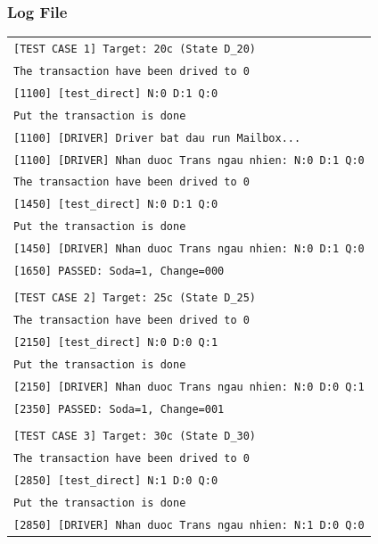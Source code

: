 \subsubsection*{Log File}

\begin{table}[H]
	\centering
	\begin{tabular}{|p{}|}
		\hline
		\texttt{\small [TEST CASE 1] Target: 20c (State D\_20)} \\
		\texttt{\small The transaction have been drived to 0} \\
		\texttt{\small [1100] [test\_direct] N:0 D:1 Q:0} \\
		\texttt{\small Put the transaction is done} \\
		\texttt{\small [1100] [DRIVER] Driver bat dau run Mailbox...} \\
		\texttt{\small [1100] [DRIVER] Nhan duoc Trans ngau nhien: N:0 D:1 Q:0} \\
		\texttt{\small The transaction have been drived to 0} \\
		\texttt{\small [1450] [test\_direct] N:0 D:1 Q:0} \\
		\texttt{\small Put the transaction is done} \\
		\texttt{\small [1450] [DRIVER] Nhan duoc Trans ngau nhien: N:0 D:1 Q:0} \\
		\texttt{\small [1650] PASSED: Soda=1, Change=000} \\
		\texttt{\small } \\
		\texttt{\small [TEST CASE 2] Target: 25c (State D\_25)} \\
		\texttt{\small The transaction have been drived to 0} \\
		\texttt{\small [2150] [test\_direct] N:0 D:0 Q:1} \\
		\texttt{\small Put the transaction is done} \\
		\texttt{\small [2150] [DRIVER] Nhan duoc Trans ngau nhien: N:0 D:0 Q:1} \\
		\texttt{\small [2350] PASSED: Soda=1, Change=001} \\
		\texttt{\small } \\
		\texttt{\small [TEST CASE 3] Target: 30c (State D\_30)} \\
		\texttt{\small The transaction have been drived to 0} \\
		\texttt{\small [2850] [test\_direct] N:1 D:0 Q:0} \\
		\texttt{\small Put the transaction is done} \\
		\texttt{\small [2850] [DRIVER] Nhan duoc Trans ngau nhien: N:1 D:0 Q:0} \\

\end{tabular}
\end{table}
